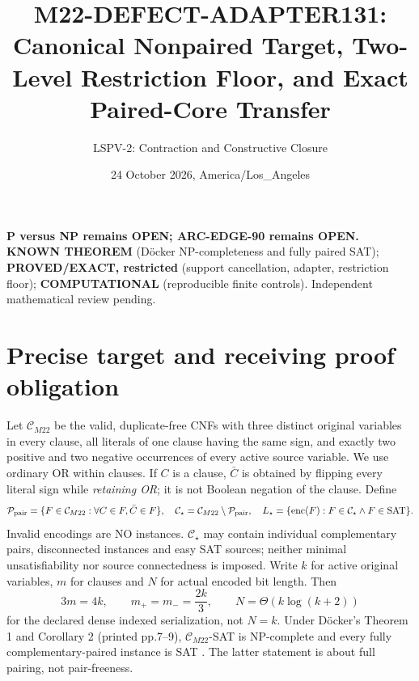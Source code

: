 \documentclass[10pt]{article}
\title{M22-DEFECT-ADAPTER131: Canonical Nonpaired Target, Two-Level Restriction Floor, and Exact Paired-Core Transfer}
\author{LSPV-2: Contraction and Constructive Closure}
\date{24 October 2026, America/Los\_Angeles}
\begin{document}
\maketitle
\begin{center}
\textbf{P versus NP remains OPEN; ARC-EDGE-90 remains OPEN.}\\
\textbf{KNOWN THEOREM} (D\"ocker NP-completeness and fully paired SAT);
\textbf{PROVED/EXACT, restricted} (support cancellation, adapter, restriction floor);
\textbf{COMPUTATIONAL} (reproducible finite controls). Independent mathematical review pending.
\end{center}
\section{Precise target and receiving proof obligation}
Let \(\mathcal C_{M22}\) be the valid, duplicate-free CNFs with three distinct original variables in every clause, all literals of one clause having the same sign, and exactly two positive and two negative occurrences of every active source variable. We use ordinary OR within clauses. If \(C\) is a clause, \(\bar C\) is obtained by flipping every literal sign while \emph{retaining OR}; it is not Boolean negation of the clause. Define
\[
\mathcal P_{\rm pair}=\{F\in\mathcal C_{M22}:\forall C\in F,\bar C\in F\},
\quad
\mathcal C_\star=\mathcal C_{M22}\setminus\mathcal P_{\rm pair},
\quad
L_\star=\{\operatorname{enc}(F):F\in\mathcal C_\star\land F\in{\rm SAT}\}.
\]
Invalid encodings are NO instances. \(\mathcal C_\star\) may contain individual complementary pairs, disconnected instances and easy SAT sources; neither minimal unsatisfiability nor source connectedness is imposed. Write \(k\) for active original variables, \(m\) for clauses and \(N\) for actual encoded bit length. Then
\[
3m=4k,\qquad m_+=m_-=\frac{2k}{3},\qquad N=\Theta(k\log(k+2))
\]
for the declared dense indexed serialization, not \(N=k\). Under D\"ocker's Theorem 1 and Corollary 2 (printed pp.7--9), \(\mathcal C_{M22}\)-SAT is NP-complete and every fully complementary-paired instance is SAT \cite{docker}. The latter statement is about full pairing, not pair-freeness.
\end{document}
